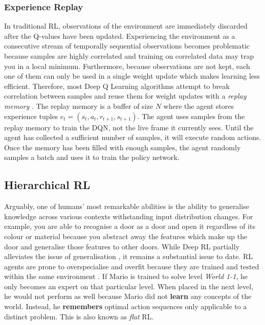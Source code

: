 \documentclass[notitlepage,a4paper,11pt]{article}
\begin{document}

\subsubsection{Experience Replay}
In traditional RL, observations of the environment are immediately discarded after the Q-values have been updated. Experiencing the environment as a consecutive stream of temporally sequential observations becomes problematic because samples are highly correlated and training on correlated data may trap you in a local minimum. Furthermore, because observations are not kept, each one of them can only be used in a single weight update which makes learning less efficient. Therefore, most Deep Q Learning algorithms attempt to break correlation between samples and reuse them for weight updates with a \textit{replay memory} \cite{lin1993reinforcement}. The replay memory is a buffer of size $N$ where the agent stores experience tuples $e_t = (s_t, a_t, r_{t+1}, s_{t+1})$. The agent uses samples from the replay memory to train the DQN, not the live frame it currently sees. Until the agent has collected a sufficient number of samples, it will execute random actions. Once the memory has been filled with enough samples, the agent randomly samples a batch and uses it to train the policy network. 


\subsection{Hierarchical RL}
Arguably, one of humans' most remarkable abilities is the ability to generalise knowledge \cite{geirhos2018generalisation} across various contexts withstanding input distribution changes. For example, you are able to recognise a door as a door and open it regardless of its colour or material because you abstract away the features which make up the door and generalise those features to other doors. While Deep RL partially alleviates the issue of generalisation \cite{sutton1996generalization}, it remains a substantial issue \cite{van2017hybrid} to date. RL agents are prone to overspecialise and overfit because they are trained and tested within the same environment \cite{cobbe2018quantifying}. If Mario is trained to solve level \textit{World 1-1}, he only becomes an expert on that particular level. When placed in the next level, he would not perform as well because Mario did not \textbf{learn} any concepts of the world. Instead, he \textbf{remembers} optimal action sequences only applicable to a distinct problem. This is also known as \textit{flat} RL.
\end{document}
